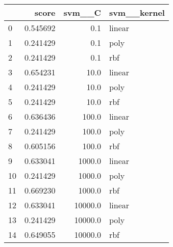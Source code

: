 \begin{tabular}{lrrl}
\toprule
{} &     score &   svm\_\_C & svm\_\_kernel \\
\midrule
0  &  0.545692 &      0.1 &      linear \\
1  &  0.241429 &      0.1 &        poly \\
2  &  0.241429 &      0.1 &         rbf \\
3  &  0.654231 &     10.0 &      linear \\
4  &  0.241429 &     10.0 &        poly \\
5  &  0.241429 &     10.0 &         rbf \\
6  &  0.636436 &    100.0 &      linear \\
7  &  0.241429 &    100.0 &        poly \\
8  &  0.605156 &    100.0 &         rbf \\
9  &  0.633041 &   1000.0 &      linear \\
10 &  0.241429 &   1000.0 &        poly \\
11 &  0.669230 &   1000.0 &         rbf \\
12 &  0.633041 &  10000.0 &      linear \\
13 &  0.241429 &  10000.0 &        poly \\
14 &  0.649055 &  10000.0 &         rbf \\
\bottomrule
\end{tabular}
